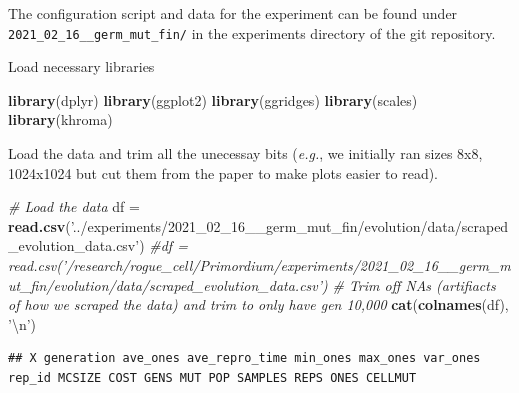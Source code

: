 \documentclass[]{book}
\newenvironment{Shaded}{\begin{snugshade}}{\end{snugshade}}
\newcommand{\CharTok}[1]{\textcolor[rgb]{0.31,0.60,0.02}{#1}}
\newcommand{\CommentTok}[1]{\textcolor[rgb]{0.56,0.35,0.01}{\textit{#1}}}
\newcommand{\DecValTok}[1]{\textcolor[rgb]{0.00,0.00,0.81}{#1}}
\newcommand{\KeywordTok}[1]{\textcolor[rgb]{0.13,0.29,0.53}{\textbf{#1}}}
\newcommand{\NormalTok}[1]{#1}
\newcommand{\OperatorTok}[1]{\textcolor[rgb]{0.81,0.36,0.00}{\textbf{#1}}}
\newcommand{\StringTok}[1]{\textcolor[rgb]{0.31,0.60,0.02}{#1}}
\begin{document}
The configuration script and data for the experiment can be found under \texttt{2021\_02\_16\_\_germ\_mut\_fin/} in the experiments directory of the git repository.

Load necessary libraries

\begin{Shaded}
\begin{Highlighting}[]
\KeywordTok{library}\NormalTok{(dplyr)}
\KeywordTok{library}\NormalTok{(ggplot2)}
\KeywordTok{library}\NormalTok{(ggridges)}
\KeywordTok{library}\NormalTok{(scales)}
\KeywordTok{library}\NormalTok{(khroma)}
\end{Highlighting}
\end{Shaded}

Load the data and trim all the unecessay bits (\emph{e.g.}, we initially ran sizes 8x8, 1024x1024 but cut them from the paper to make plots easier to read).

\begin{Shaded}
\begin{Highlighting}[]
\CommentTok{# Load the data}
\NormalTok{df =}\StringTok{ }\KeywordTok{read.csv}\NormalTok{(}\StringTok{'../experiments/2021_02_16__germ_mut_fin/evolution/data/scraped_evolution_data.csv'}\NormalTok{)}
\CommentTok{#df = read.csv('/research/rogue_cell/Primordium/experiments/2021_02_16__germ_mut_fin/evolution/data/scraped_evolution_data.csv')}
\CommentTok{# Trim off NAs (artifiacts of how we scraped the data) and trim to only have gen 10,000}
\KeywordTok{cat}\NormalTok{(}\KeywordTok{colnames}\NormalTok{(df), }\StringTok{'}\CharTok{\textbackslash{}n}\StringTok{'}\NormalTok{)}
\end{Highlighting}
\end{Shaded}

\begin{verbatim}
## X generation ave_ones ave_repro_time min_ones max_ones var_ones rep_id MCSIZE COST GENS MUT POP SAMPLES REPS ONES CELLMUT
\end{verbatim}

\begin{Shaded}
\end{Shaded}
\end{document}
